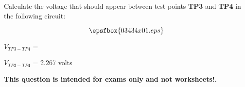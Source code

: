 

Calculate the voltage that should appear between test points {\bf TP3} and {\bf TP4} in the following circuit:

$$\epsfbox{03434x01.eps}$$

$V_{TP3-TP4}$ = 







$V_{TP3-TP4}$ = 2.267 volts







{\bf This question is intended for exams only and not worksheets!}.



